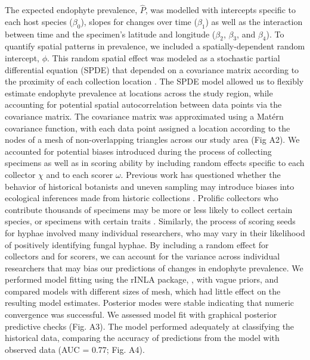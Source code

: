 \documentclass[11pt]{article}
\let\cite\citep
\begin{document}
The expected endophyte prevalence, $\hat{P}$, was modelled with intercepts specific to each host species ($\beta_{0}$), slopes for changes over time ($\beta_{1}$) as well as the interaction between time and the specimen's latitude and longitude ($\beta_{2}$, $\beta_{3}$, and $\beta_{4}$). 
To quantify spatial patterns in prevalence, we included a spatially-dependent random intercept, $\phi$.
This random spatial effect was modeled as a stochastic partial differential equation (SPDE) that depended on a covariance matrix according to the proximity of each collection location \citep{lindgren2011explicit,bakka2018spatial}. 
The SPDE model allowed us to flexibly estimate endophyte prevalence at locations across the study region, while accounting for potential spatial autocorrelation between data points via the covariance matrix. 
The covariance matrix was approximated using a Matérn covariance function, with each data point assigned a location according to the nodes of a mesh of non-overlapping triangles across our study area (Fig A2).
We accounted for potential biases introduced during the process of collecting specimens as well as in scoring ability by including random effects specific to each collector $\chi$ and to each scorer $\omega$.
Previous work has questioned whether the behavior of historical botanists and uneven sampling may introduce biases into ecological inferences made from historic collections \cite{kozlov2020biases}. 
Prolific collectors who contribute thousands of specimens may be more or less likely to collect certain species, or specimens with certain traits \cite{daru2018widespread}. 
Similarly, the process of scoring seeds for hyphae involved many individual researchers, who may vary in their likelihood of positively identifying fungal hyphae. 
By including a random effect for collectors and for scorers, we can account for the variance across individual researchers that may bias our predictions of changes in endophyte prevalence.
We performed model fitting using the rINLA package, \citep{lindgren2015bayesian}, with vague priors, and compared models with different sizes of mesh, which had little effect on the resulting model estimates.
Posterior modes were stable indicating that numeric convergence was successful.
We assessed model fit with graphical posterior predictive checks (Fig. A3).
The model performed adequately at classifying the historical data, comparing the accuracy of predictions from the model with observed data (AUC = 0.77; Fig. A4). 
\end{document}
